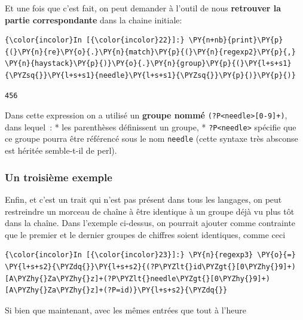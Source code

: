     Et une fois que c'est fait, on peut demander à l'outil de nous
\textbf{retrouver la partie correspondante} dans la chaine initiale:

    \begin{Verbatim}[commandchars=\\\{\}]
{\color{incolor}In [{\color{incolor}22}]:} \PY{n+nb}{print}\PY{p}{(}\PY{n}{re}\PY{o}{.}\PY{n}{match}\PY{p}{(}\PY{n}{regexp2}\PY{p}{,} \PY{n}{haystack}\PY{p}{)}\PY{o}{.}\PY{n}{group}\PY{p}{(}\PY{l+s+s1}{\PYZsq{}}\PY{l+s+s1}{needle}\PY{l+s+s1}{\PYZsq{}}\PY{p}{)}\PY{p}{)}
\end{Verbatim}


    \begin{Verbatim}[commandchars=\\\{\}]
456

    \end{Verbatim}

    Dans cette expression on a utilisé un \textbf{groupe nommé}
\texttt{(?P\textless{}needle\textgreater{}{[}0-9{]}+)}, dans lequel~: *
les parenthèses définissent un groupe, *
\texttt{?P\textless{}needle\textgreater{}} spécifie que ce groupe pourra
être référencé sous le nom \texttt{needle} (cette syntaxe très absconse
est héritée semble-t-il de perl).

    \hypertarget{un-troisiuxe8me-exemple}{%
\subsubsection{Un troisième exemple}\label{un-troisiuxe8me-exemple}}

    Enfin, et c'est un trait qui n'est pas présent dans tous les langages,
on peut restreindre un morceau de chaîne à être identique à un groupe
déjà vu plus tôt dans la chaîne. Dans l'exemple ci-dessus, on pourrait
ajouter comme contrainte que le premier et le dernier groupes de
chiffres soient identiques, comme ceci

    \begin{Verbatim}[commandchars=\\\{\}]
{\color{incolor}In [{\color{incolor}23}]:} \PY{n}{regexp3} \PY{o}{=} \PY{l+s+s2}{\PYZdq{}}\PY{l+s+s2}{(?P\PYZlt{}id\PYZgt{}[0\PYZhy{}9]+)[A\PYZhy{}Za\PYZhy{}z]+(?P\PYZlt{}needle\PYZgt{}[0\PYZhy{}9]+)[A\PYZhy{}Za\PYZhy{}z]+(?P=id)}\PY{l+s+s2}{\PYZdq{}}
\end{Verbatim}


    Si bien que maintenant, avec les mêmes entrées que tout à l'heure

